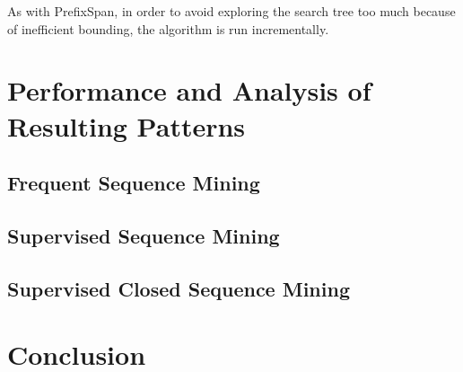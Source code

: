 \documentclass{sigkddExp}
\newcommand{\ps}{\textsf{PrefixSpan}}
\begin{document}
As with \ps, in order to avoid exploring the search tree too much because of inefficient bounding, the algorithm is run incrementally.

\section{Performance and Analysis of Resulting Patterns}
\subsection{Frequent Sequence Mining}
\subsection{Supervised Sequence Mining}
\subsection{Supervised Closed Sequence Mining}


\section{Conclusion}

\printbibliography
\end{document}
